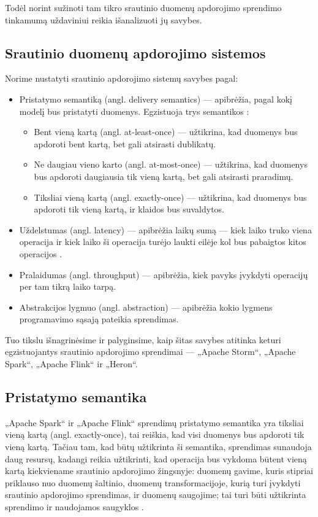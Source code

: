 \documentclass{VUMIFPSbakalaurinis}
\begin{document}
Todėl norint sužinoti tam tikro srautinio duomenų apdorojimo sprendimo tinkamumą uždaviniui reikia išanalizuoti jų savybes.   
\subsection{Srautinio duomenų apdorojimo sistemos}

Norime nustatyti srautinio apdorojimo sistemų savybes pagal:
\begin{itemize}
    \item Pristatymo semantiką (angl. delivery semantics) — apibrėžia, pagal kokį modelį bus pristatyti duomenys. Egzistuoja trys semantikos \cite{ensar20}: 
    \begin{itemize}
        \item Bent vieną kartą (angl. at-least-once) — užtikrina, kad duomenys bus apdoroti bent kartą, bet gali atsirasti dublikatų. 
        \item Ne daugiau vieno karto (angl. at-most-once) — užtikrina, kad duomenys bus apdoroti daugiausia tik vieną kartą, bet gali atsirasti praradimų. 
        \item Tiksliai vieną kartą (angl. exactly-once) — užtikrina, kad duomenys bus apdoroti tik vieną kartą, ir klaidos bus suvaldytos.
    \end{itemize}
    \item Uždelstumas (angl. latency) — apibrėžia laikų sumą — kiek laiko truko viena operacija ir kiek laiko ši operacija turėjo laukti eilėje kol bus pabaigtos kitos operacijos \cite{karimov2018benchmarking}.
    \item Pralaidumas (angl. throughput) — apibrėžia, kiek pavyks įvykdyti operacijų per tam tikrą laiko tarpą.
    \item Abstrakcijos lygmuo (angl. abstraction) — apibrėžia kokio lygmens programavimo sąsają pateikia sprendimas.
\end{itemize}
Tuo tikslu išnagrinėsime ir palyginsime, kaip šitas savybes atitinka keturi egzistuojantys srautinio apdorojimo sprendimai — „Apache Storm“, „Apache Spark“, „Apache Flink“ ir „Heron“.

\subsection{Pristatymo semantika}
„Apache Spark“ ir „Apache Flink“ sprendimų pristatymo semantika yra tiksliai vieną kartą (angl. exactly-once), tai reiškia, kad visi duomenys bus apdoroti tik vieną kartą. Tačiau tam, kad būtų užtikrinta ši semantika, sprendimas sunaudoja daug resursų, kadangi reikia užtikrinti, kad operacija bus vykdoma būtent vieną kartą kiekviename srautinio apdorojimo žingsnyje: duomenų gavime, kuris stipriai priklauso nuo duomenų šaltinio, duomenų transformacijoje, kurią turi įvykdyti srautinio apdorojimo sprendimas, ir duomenų saugojime; tai turi būti užtikrinta sprendimo ir naudojamos saugyklos \cite{zhang20}.\par
\end{document}

